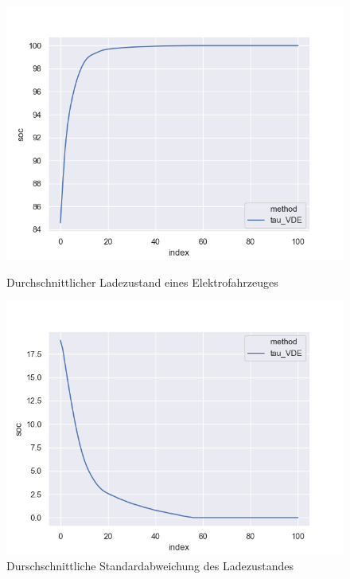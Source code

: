 \begin{figure}[htb]
	\centering
	\begin{minipage}[t]{0.45\linewidth}
		\centering
        \includegraphics[width=0.8\linewidth]{img/VDE_tau/tau_VDE_2_soc_mean.png}
        \caption{Durchschnittlicher Ladezustand eines Elektrofahrzeuges}
        \label{ABB_VDEtauSocMEAN}
	\end{minipage}
	\hfill
	\begin{minipage}[t]{0.45\linewidth}
		\centering
        \includegraphics[width=0.8\linewidth]{img/VDE_tau/tau_VDE_2_soc_std.png}
        \caption{Durschschnittliche Standardabweichung des Ladezustandes}
        \label{ABB_VDEtauSocSTD}
	\end{minipage}
\end{figure}

